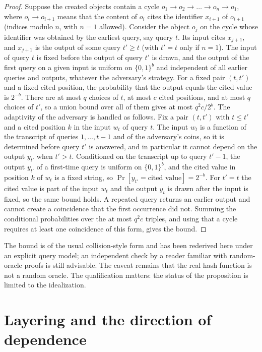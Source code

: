 \documentclass[11pt,twoside,openright]{book}
\theoremstyle{plain}
\theoremstyle{definition}
\theoremstyle{remark}
\begin{document}
\begin{proof}
Suppose the created objects contain a cycle $o_1\to o_2\to\dots\to o_n\to o_1$, where $o_i\to o_{i+1}$ means that the content of $o_i$ cites the identifier $x_{i+1}$ of $o_{i+1}$ (indices modulo $n$, with $n=1$ allowed). Consider the object $o_j$ on the cycle whose identifier was obtained by the earliest query, say query $t$. Its input cites $x_{j+1}$, and $x_{j+1}$ is the output of some query $t'\ge t$ (with $t'=t$ only if $n=1$). The input of query $t$ is fixed before the output of query $t'$ is drawn, and the output of the first query on a given input is uniform on $\{0,1\}^b$ and independent of all earlier queries and outputs, whatever the adversary's strategy. For a fixed pair $(t,t')$ and a fixed cited position, the probability that the output equals the cited value is $2^{-b}$. There are at most $q$ choices of $t$, at most $c$ cited positions, and at most $q$ choices of $t'$, so a union bound over all of them gives at most $q^2c/2^b$. The adaptivity of the adversary is handled as follows. Fix a pair $(t,t')$ with $t\le t'$ and a cited position $k$ in the input $w_t$ of query $t$. The input $w_t$ is a function of the transcript of queries $1,\dots,t-1$ and of the adversary's coins, so it is determined before query $t'$ is answered, and in particular it cannot depend on the output $y_{t'}$ when $t'>t$. Conditioned on the transcript up to query $t'-1$, the output $y_{t'}$ of a first-time query is uniform on $\{0,1\}^b$, and the cited value in position $k$ of $w_t$ is a fixed string, so $\Pr[y_{t'}=\text{cited value}]=2^{-b}$. For $t'=t$ the cited value is part of the input $w_t$ and the output $y_t$ is drawn after the input is fixed, so the same bound holds. A repeated query returns an earlier output and cannot create a coincidence that the first occurrence did not. Summing the conditional probabilities over the at most $q^2c$ triples, and using that a cycle requires at least one coincidence of this form, gives the bound.
\end{proof}

The bound is of the usual collision-style form and has been rederived here under an explicit query model; an independent check by a reader familiar with random-oracle proofs is still advisable. The caveat remains that the real hash function is not a random oracle. The qualification matters: the status of the proposition is limited to the idealization.

\section{Layering and the direction of dependence}
\end{document}
